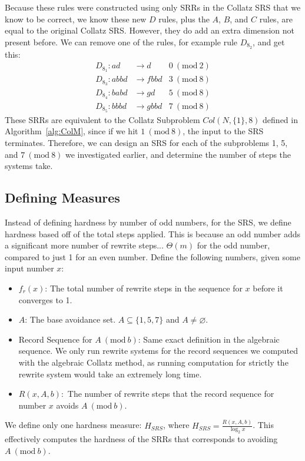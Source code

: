 \documentclass[12pt]{article}
\newcommand{\Mod}[1]{\ (\mathrm{mod}\ #1)}
\theoremstyle{definition}
\begin{document}
Because these rules were constructed using only SRRs in the Collatz SRS that we know to be correct, we know these new $D$ rules, plus the $A$, $B$, and $C$ rules, are equal to the original Collatz SRS. However, they do add an extra dimension not present before. We can remove one of the rules, for example rule $D_{8_2}$, and get this:
\begin{align*}
    D_{8_1}: ad &\rightarrow d &\text{$0\Mod{2}$}\\
    D_{8_3}: abbd &\rightarrow fbbd &\text{$3\Mod{8}$}\\
    D_{8_4}: babd &\rightarrow gd &\text{$5\Mod{8}$}\\
    D_{8_5}: bbbd &\rightarrow gbbd &\text{$7\Mod{8}$}
\end{align*}
These SRRs are equivalent to the Collatz Subproblem $Col(N,\{1\},8)$ defined in Algorithm~\ref{alg:ColM}, since if we hit $1 \Mod{8}$, the input to the SRS terminates. Therefore, we can design an SRS for each of the subproblems 1, 5, and $7 \Mod{8}$ we investigated earlier, and determine the number of steps the systems take.

\subsection{Defining Measures} \label{subsec:rewritemeasuredefs}
Instead of defining hardness by number of odd numbers, for the SRS, we define hardness based off of the total steps applied. This is because an odd number adds a significant more number of rewrite steps... $\Theta(m)$ for the odd number, compared to just 1 for an even number. Define the following numbers, given some input number $x$:
\begin{itemize}
    \item $f_r(x)$: The total number of rewrite steps in the sequence for $x$ before it converges to 1.
    \item $A$: The base avoidance set. $A \subseteq \{1, 5, 7\}$ and $A \ne \varnothing$.
    \item Record Sequence for $A \Mod{b}$: Same exact definition in the algebraic sequence. We only run rewrite systems for the record sequences we computed with the algebraic Collatz method, as running computation for strictly the rewrite system would take an extremely long time.
    \item $R(x, A, b):$ The number of rewrite steps that the record sequence for number $x$ avoids $A \Mod{b}$. 
\end{itemize}
We define only one hardness measure: $H_{SRS}$, where $H_{SRS} = \frac{R(x, A, b)}{\log_2{x}}$. This effectively computes the hardness of the SRRs that corresponds to avoiding $A \Mod{b}$.
\end{document}
